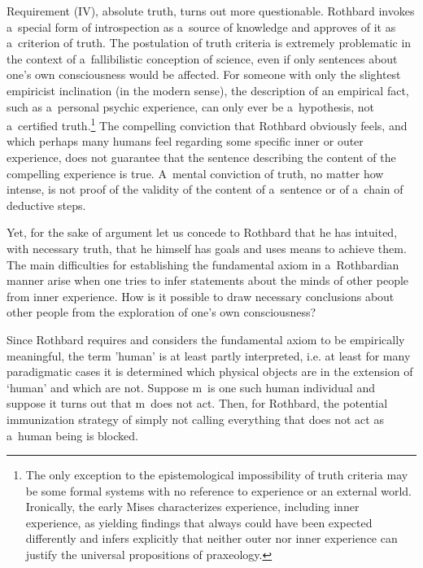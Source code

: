 Requirement (IV), absolute truth, turns out more questionable. Rothbard invokes a~special form of introspection as a~source of knowledge and approves of it as a~criterion of truth. The postulation of truth criteria is extremely problematic in the context of a~fallibilistic conception of science, even if only sentences about one's own consciousness would be affected. For someone with only the slightest empiricist inclination (in the modern sense), the description of an empirical fact, such as a~personal psychic experience, can only ever be a~hypothesis, not a~certified truth.\footnote{The only exception to the epistemological impossibility of truth criteria may be some formal systems with no reference to experience or an external world. Ironically, the early Mises 
\parencite*[][p.18]{mises_nationalokonomie_1940} %
 characterizes experience, including inner experience, as yielding findings that always could have been expected differently and infers explicitly that neither outer nor inner experience can justify the universal propositions of praxeology.} The compelling conviction that Rothbard obviously feels, and which perhaps many humans feel regarding some specific inner or outer experience, does not guarantee that the sentence describing the content of the compelling experience is true. A~mental conviction of truth, no matter how intense, is not proof of the validity of the content of a~sentence or of a~chain of deductive steps.



Yet, for the sake of argument let us concede to Rothbard that he has intuited, with necessary truth, that he himself has goals and uses means to achieve them. The main difficulties for establishing the fundamental axiom in a~Rothbardian manner arise when one tries to infer statements about the minds of other people from inner experience. How is it possible to draw necessary conclusions about other people from the exploration of one's own consciousness?



Since Rothbard requires and considers the fundamental axiom to be empirically meaningful, the term 'human' is at least partly interpreted, i.e. at least for many paradigmatic cases it is determined which physical objects are in the extension of ‘human' and which are not. Suppose m~is one such human individual and suppose it turns out that m~does not act. Then, for Rothbard, the potential immunization strategy of simply not calling everything that does not act as a~human being is blocked.



